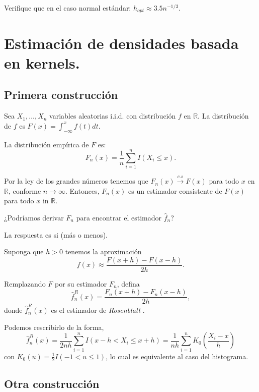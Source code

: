 \documentclass[
  12pt,
]{book}
\begin{document}
\leavevmode{}%
Verifique que en el caso normal estándar:
\(h_{opt}\approx 3.5 n^{-1/3}\).

\hypertarget{estimaciuxf3n-de-densidades-basada-en-kernels.}{%
\section{Estimación de densidades basada en
kernels.}\label{estimaciuxf3n-de-densidades-basada-en-kernels.}}

\hypertarget{primera-construcciuxf3n}{%
\subsection{Primera construcción}\label{primera-construcciuxf3n}}

Sea \(X_{1},\ldots,X_{n}\) variables aleatorias i.i.d. con distribución
\(f\) en \(\mathbb{R}\). La distribución de \(f\) es
\(F(x)=\int_{-\infty}^{x}f(t)dt\).

La distribución empírica de \(F\) es: \[
F_{n}(x)=\frac{1}{n}\sum_{i=1}^{n}I(X_{i}\leq x).
\]

Por la ley de los grandes números tenemos que
\(F_{n}(x) \xrightarrow{c.s} F(x)\) para todo \(x\) en \(\mathbb{R}\),
conforme \(n\rightarrow\infty\). Entonces, \(F_{n}(x)\) es un estimador
consistente de \(F(x)\) para todo \(x\) in \(\mathbb{R}\).

¿Podríamos derivar \(F_n\) para encontrar el estimador \(\hat{f}_n\)?

La respuesta es si (más o menos).

Suponga que \(h>0\) tenemos la aproximación \[
f(x)\approx\frac{F(x+h)-F(x-h)}{2h}.
\]

Remplazando \(F\) por su estimador \(F_{n}\), defina \[
\hat{f}_{n}^{R}(x)=\frac{F_{n}(x+h)-F_{n}(x-h)}{2h},
\] donde \(\hat{f}_{n}^{R}(x)\) es el estimador de \emph{Rosenblatt} .

Podemos rescribirlo de la forma, \[
\hat{f}_{n}^{R}(x)=\frac{1}{2nh}\sum_{i=1}^{n}I(x-h<X_{i}\leq x+h)=\frac{1}{nh}\sum_{i=1}^{n}K_{0}\left(\frac{X_{i}-x}{h}\right)
\] con \(K_{0}(u)=\frac{1}{2}I(-1<u\leq1)\), lo cual es equivalente al
caso del histograma.

\hypertarget{otra-construcciuxf3n}{%
\subsection{Otra construcción}\label{otra-construcciuxf3n}}
\end{document}
